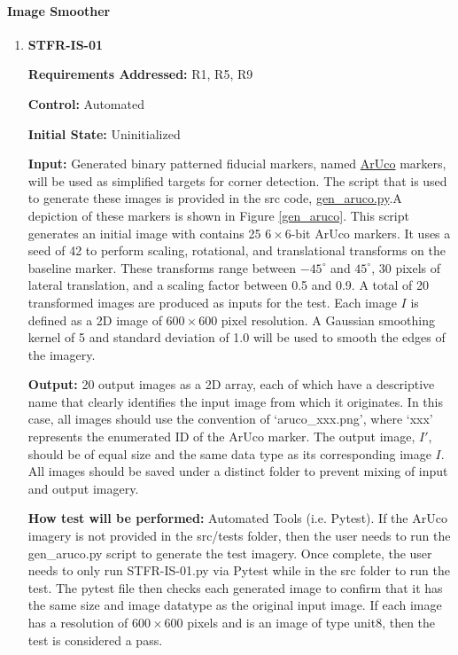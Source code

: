 \documentclass[12pt, titlepage]{article}
\begin{document}
\paragraph{Image Smoother}
\begin{enumerate}
\item \hypertarget{STFR-IS-01}{\textbf{STFR-IS-01}}

\textbf{Requirements Addressed:} R1, R5, R9

\textbf{Control:} Automated		

\textbf{Initial State:} Uninitialized

\textbf{Input:} Generated binary patterned fiducial markers, named 
\href{https://docs.opencv.org/4.x/d5/dae/tutorial_aruco_detection.html}
{ArUco} markers, will be used as simplified targets for corner detection. The script that is used to generate these images is provided in the src code, \href{https://github.com/KiranSingh15/CAS-741-Image-Correspondences/blob/main/src/tests/gen_arcuo.py}{gen\_aruco.py}.A depiction of these markers is shown in Figure \ref{gen_aruco}. This script generates an initial image with contains 25 $6\times 6$-bit ArUco markers. It uses a seed of 42 to perform scaling, rotational, and translational transforms on the baseline marker. These transforms range between $-45^\circ$ and $45^\circ$, 30 pixels of lateral translation, and a scaling factor between 0.5 and 0.9. A total of 20 transformed images are produced as inputs for the test. Each image $I$ is defined as a 2D image of $600 \times 600$ pixel resolution. A Gaussian smoothing kernel of 5 and standard deviation of 1.0 will be used to smooth the edges of the imagery. 

\textbf{Output:} 20 output images as a 2D array, each of which have a descriptive name that clearly identifies the input image from which it originates. In this case, all images should use the convention of `aruco\_xxx.png', where `xxx' represents the enumerated ID of the ArUco marker. The output image, $I'$, should be of equal size and the same data type as its 
corresponding image $I$. All images should be saved under a distinct folder to prevent mixing of input and output imagery.

\textbf{How test will be performed:} Automated Tools (i.e. Pytest). If the ArUco imagery is not provided in the src/tests folder, then the user needs to run the gen\_aruco.py script to generate the test imagery. Once complete, the user needs to only run STFR-IS-01.py via Pytest while in the src folder to run the test. The pytest file then checks each generated image to confirm that it has the same size and image datatype as the original input image. If each image has a resolution of $600 \times 600$ pixels and is an image of type unit8, then the test is considered a pass.

\end{enumerate}
\end{document}
